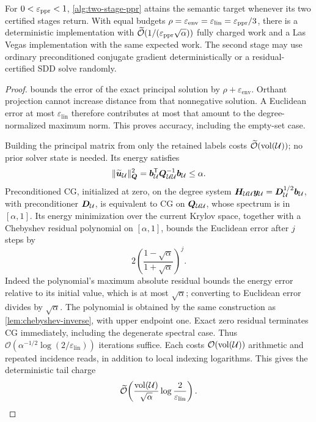 \begin{theorem}
\label{thm:two-stage-completion}
For $0<\varepsilon_{\mathrm{ppr}}<1$, \cref{alg:two-stage-ppr} attains the semantic target
whenever its two certified stages return. With equal budgets
$\rho=\varepsilon_{\mathrm{env}}=\varepsilon_{\mathrm{lin}}=\varepsilon_{\mathrm{ppr}}/3$, there
is a deterministic implementation with
$\widetilde{\mathcal{O}}(1/(\varepsilon_{\mathrm{ppr}}\sqrt\alpha))$ fully charged work and a Las Vegas
implementation with the same expected work. The second stage may use
ordinary preconditioned conjugate gradient deterministically or a
residual-certified SDD solve randomly.
\end{theorem}
\begin{proof}
 bounds the error of the exact principal
solution by $\rho+\varepsilon_{\mathrm{env}}$.
Orthant projection cannot increase distance from that nonnegative solution.
A Euclidean error at most $\varepsilon_{\mathrm{lin}}$ therefore contributes
at most that amount to the degree-normalized maximum norm. This proves
accuracy, including the empty-set case.

Building the principal matrix from only the retained labels costs
$\widetilde{\mathcal{O}}(\operatorname{vol}(\mathcal{U}))$; no prior solver state is needed. Its energy
satisfies
\[
 \lVert\widetilde{\bm{u}}_{\mathcal{U}}\rVert_{\bm{Q}}^2
 =\bm{b}_{\mathcal{U}}^{\mathsf{T}}\bm{Q}_{\mathcal{U}\mathcal{U}}^{-1}\bm{b}_{\mathcal{U}}\leq\alpha.
\]
Preconditioned CG, initialized at zero, on the degree system
$\bm{H}_{\mathcal{U}\mathcal{U}}\bm{y}_{\mathcal{U}}=\bm{D}_{\mathcal{U}}^{1/2}\bm{b}_{\mathcal{U}}$, with preconditioner $\bm{D}_{\mathcal{U}}$,
is equivalent to CG on $\bm{Q}_{\mathcal{U}\mathcal{U}}$, whose spectrum is in $[\alpha,1]$.
Its energy minimization over the current Krylov space, together with a
Chebyshev residual polynomial on $[\alpha,1]$, bounds the Euclidean error
after $j$ steps by
\[
 2\left(\frac{1-\sqrt\alpha}{1+\sqrt\alpha}\right)^j.
\]
Indeed the polynomial's maximum absolute residual bounds the energy error
relative to its initial value, which is at most $\sqrt\alpha$; converting
to Euclidean error divides by $\sqrt\alpha$.
The polynomial is obtained by the same construction as
\cref{lem:chebyshev-inverse}, with upper endpoint one. Exact zero residual
terminates CG immediately, including the degenerate spectral case.
Thus $\mathcal{O}(\alpha^{-1/2}\log(2/\varepsilon_{\mathrm{lin}}))$ iterations suffice.
Each costs $\mathcal{O}(\operatorname{vol}(\mathcal{U}))$ arithmetic and repeated incidence reads, in
addition to local indexing logarithms. This gives the deterministic tail
charge
\begin{equation*}
 \widetilde{\mathcal{O}}\!\left(\frac{\operatorname{vol}(\mathcal{U})}{\sqrt\alpha}
                  \log\frac2{\varepsilon_{\mathrm{lin}}}\right).
\end{equation*}


\end{proof}
